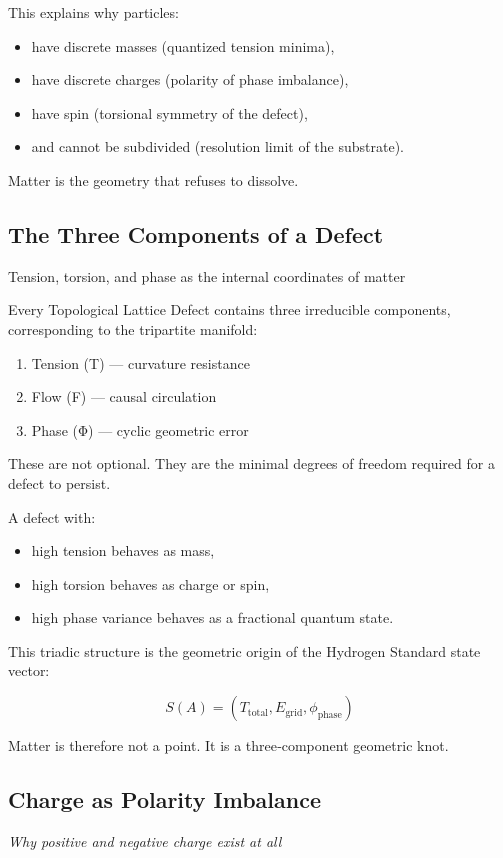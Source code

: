 \documentclass[reprint,amsmath,amssymb,aps,prl,floatfix]{revtex4-2}
\begin{document}
\begin{itemize}
This explains why particles:
\begin{itemize}
\item have discrete masses (quantized tension minima),  
\item have discrete charges (polarity of phase imbalance),  
\item have spin (torsional symmetry of the defect),  
\item and cannot be subdivided (resolution limit of the substrate).
\end{itemize}

Matter is the geometry that refuses to dissolve.

\subsection{The Three Components of a Defect}

Tension, torsion, and phase as the internal coordinates of matter

Every Topological Lattice Defect contains three irreducible components, corresponding to the tripartite manifold:
\begin{enumerate}
\item Tension (T) — curvature resistance  
\item Flow (F) — causal circulation  
\item Phase (Φ) — cyclic geometric error  
\end{enumerate}
\medskip

These are not optional.  
They are the minimal degrees of freedom required for a defect to persist.
\medskip

A defect with:
\begin{itemize}
\item high tension behaves as mass,  
\item high torsion behaves as charge or spin,  
\item high phase variance behaves as a fractional quantum state.
\end{itemize}
\medskip

This triadic structure is the geometric origin of the Hydrogen Standard state vector:

\[
S(A) = (T_{\mathrm{total}}, E_{\mathrm{grid}}, \phi_{\mathrm{phase}})
\]

Matter is therefore not a point.  
It is a three‑component geometric knot.

\subsection{Charge as Polarity Imbalance}
\textit{Why positive and negative charge exist at all}


\end{itemize}
\end{document}

